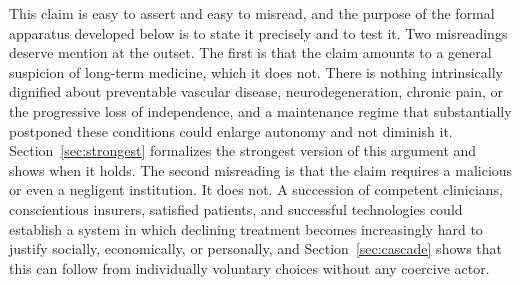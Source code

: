 \documentclass[11pt]{article}
\theoremstyle{plain}
\theoremstyle{definition}
\theoremstyle{remark}
\begin{document}
This claim is easy to assert and easy to misread, and the purpose of the formal apparatus developed below is to state it precisely and to test it. Two misreadings deserve mention at the outset. The first is that the claim amounts to a general suspicion of long-term medicine, which it does not. There is nothing intrinsically dignified about preventable vascular disease, neurodegeneration, chronic pain, or the progressive loss of independence, and a maintenance regime that substantially postponed these conditions could enlarge autonomy and not diminish it. Section~\ref{sec:strongest} formalizes the strongest version of this argument and shows when it holds. The second misreading is that the claim requires a malicious or even a negligent institution. It does not. A succession of competent clinicians, conscientious insurers, satisfied patients, and successful technologies could establish a system in which declining treatment becomes increasingly hard to justify socially, economically, or personally, and Section~\ref{sec:cascade} shows that this can follow from individually voluntary choices without any coercive actor.
\end{document}
